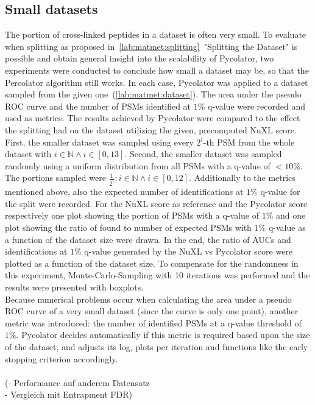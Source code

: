 \subsection{Small datasets}
\label{lab:matmet:small_datasets}
The portion of cross-linked peptides in a dataset is often very small. To evaluate when splitting as proposed in~\ref{lab:matmet:splitting}~"Splitting the Dataset" is possible and obtain general insight into the scalability of Pycolator, two experiments were conducted to conclude how small a dataset may be, so that the Percolator algorithm still works. In each case, Pycolator was applied to a dataset sampled from the given one~(\ref{lab:matmet:dataset}). The area under the pseudo ROC curve and the number of PSMs identified at $1\%$ q-value were recorded and used as metrics. The results achieved by Pycolator were compared to the effect the splitting had on the dataset utilizing the given, precomputed NuXL score.\\
First, the smaller dataset was sampled using every $2^i$-th PSM from the whole dataset with $i\in\mathbb{N} \land i\in[0,13]$. Second, the smaller dataset was sampled randomly using a uniform distribution from all PSMs with a q-value of $<10\%$. The portions sampled were $\frac{1}{2^i} : i\in\mathbb{N} \land i\in[0,12]$. Additionally to the metrics mentioned above, also the expected number of identifications at $1\%$ q-value for the split were recorded. For the NuXL score as reference and the Pycolator score respectively one plot showing the portion of PSMs with a q-value of $1\%$ and one plot showing the ratio of found to number of expected PSMs with $1\%$ q-value as a function of the dataset size were drawn. In the end, the ratio of AUCs and identifications at $1\%$ q-value generated by the NuXL vs Pycolator score were plotted as a function of the dataset size. To compensate for the randomness in this experiment, Monte-Carlo-Sampling with 10 iterations was performed and the results were presented with boxplots.\\
Because numerical problems occur when calculating the area under a pseudo ROC curve of a very small dataset (since the curve is only one point), another metric was introduced: the number of identified PSMs at a q-value threshold of $1\%$. Pycolator decides automatically if this metric is required based upon the size of the dataset, and adjusts its log, plots per iteration and functions like the early stopping criterion accordingly.\\\\
(- Performance auf anderem Datensatz\\
- Vergleich mit Entrapment FDR)